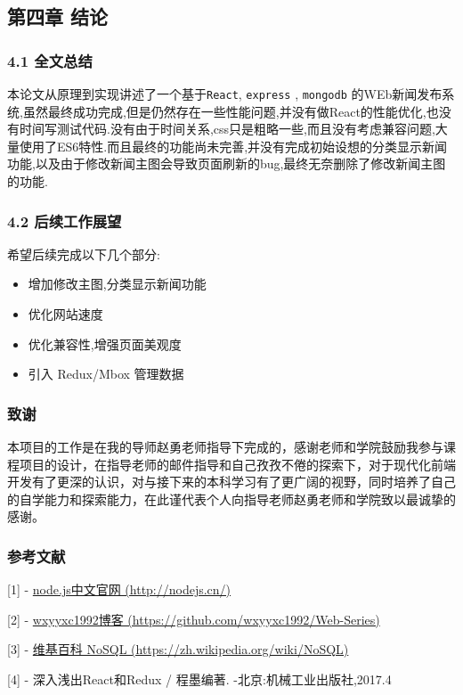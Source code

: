 \documentclass[]{article}
\begin{document}
\hypertarget{header-n179}{%
\subsection{第四章 结论}\label{header-n179}}

\hypertarget{header-n180}{%
\subsubsection{4.1 全文总结}\label{header-n180}}

本论文从原理到实现讲述了一个基于\texttt{React}, \texttt{express} ,
\texttt{mongodb}
的WEb新闻发布系统,虽然最终成功完成,但是仍然存在一些性能问题,并没有做React的性能优化,也没有时间写测试代码.没有由于时间关系,css只是粗略一些,而且没有考虑兼容问题,大量使用了ES6特性.而且最终的功能尚未完善,并没有完成初始设想的分类显示新闻功能,以及由于修改新闻主图会导致页面刷新的bug,最终无奈删除了修改新闻主图的功能.

\hypertarget{header-n183}{%
\subsubsection{4.2 后续工作展望}\label{header-n183}}

希望后续完成以下几个部分:

\begin{itemize}
\item
  增加修改主图,分类显示新闻功能
\item
  优化网站速度
\item
  优化兼容性,增强页面美观度
\item
  引入 Redux/Mbox 管理数据
\end{itemize}

\hypertarget{header-n199}{%
\subsubsection{致谢}\label{header-n199}}

本项目的工作是在我的导师赵勇老师指导下完成的，感谢老师和学院鼓励我参与课程项目的设计，在指导老师的邮件指导和自己孜孜不倦的探索下，对于现代化前端开发有了更深的认识，对与接下来的本科学习有了更广阔的视野，同时培养了自己的自学能力和探索能力，在此谨代表个人向指导老师赵勇老师和学院致以最诚挚的感谢。

\hypertarget{header-n204}{%
\subsubsection{参考文献}\label{header-n204}}

{[}1{]} - \href{http://nodejs.cn/}{node.js中文官网 (http://nodejs.cn/)}

{[}2{]} - \href{https://github.com/wxyyxc1992/Web-Series}{wxyyxc1992博客
(https://github.com/wxyyxc1992/Web-Series)}

{[}3{]} - \href{https://zh.wikipedia.org/wiki/NoSQL}{维基百科 NoSQL
(https://zh.wikipedia.org/wiki/NoSQL)}

{[}4{]} - 深入浅出React和Redux / 程墨编著. -北京:机械工业出版社,2017.4
\end{document}

